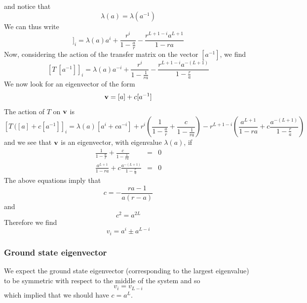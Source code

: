 and notice that
\begin{equation}
\lambda(a) = \lambda(a^{-1})
\end{equation}
We can thus write
\begin{equation}
[T\ [a]]_i= \lambda(a)a^i +\frac{r^i}{1-\frac{a}{r}}-\frac{r^{L+1-i}a^{L+1}}{1-ra}
\end{equation}
Now, considering the action of the transfer matrix on the vector $[a^{-1}]$, we find
\begin{equation}
\left[T\ [a^{-1}]\right]_i = \lambda(a) a^{-i} + \frac{r^i}{1-\frac{1}{ra}}-\frac{r^{L+1-i}a^{-(L+1)}}{1-\frac{r}{a}}
\end{equation}
We now look for an eigenvector of the form
\begin{equation}
{\bf v} = [a]+ c[a^{-1}]
\end{equation}
The action of $T$ on ${\bf v}$ is 
\begin{equation}
\left[T\ ([a]+c [a^{-1}]\right]_i = \lambda(a)[a^i + c a^{-i}]
+ r^i\left(\frac{1}{1-\frac{a}{r}}+ \frac{c}{1-\frac{1}{ra}}\right)
- r^{L+1-i} \left(\frac{a^{L+1}}{1-ra} + c\frac{a^{-(L+1)}}{1-\frac{r}{a}}\right)
\end{equation}
and we see that ${\bf v}$ is an eigenvector, with eigenvalue $\lambda(a)$, if
\begin{eqnarray}
\frac{1}{1-\frac{a}{r}}+ \frac{c}{1-\frac{1}{ra}}&=&0 \\
\frac{a^{L+1}}{1-ra} + c\frac{a^{-(L+1)}}{1-\frac{r}{a}} &=& 0
\end{eqnarray}
The above equations imply that 
\begin{equation}
c= -\frac{ra-1}{a(r-a)}
\end{equation}
and
\begin{equation}
c^2 = a^{2L}
\end{equation}
Therefore we find
\begin{equation}
v_i = a^i \pm a^{L-i}
\end{equation}

\subsubsection*{Ground state eigenvector}
We expect the ground state eigenvector (corresponding to the largest eigenvalue) to be symmetric with respect to the middle of the system and so 
\begin{equation}
v_i= v_{L-i}
\end{equation}
which implied that we should have $c= a^L$. 

